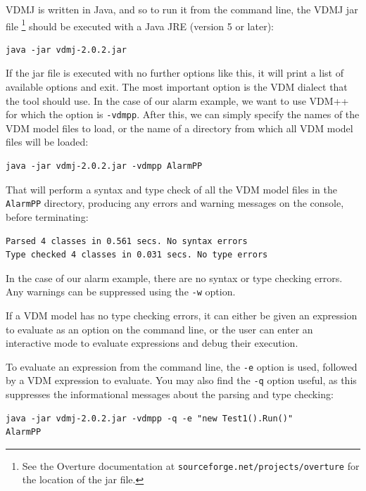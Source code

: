 VDMJ is written in Java, and so to run it from the command line, the
VDMJ jar file \footnote{See the Overture documentation at
  \texttt{sourceforge.net/projects/overture} for the location of the
  jar file.}  should be executed with a Java JRE (version 5 or later):

\lstset{style=tool,language=}
\begin{lstlisting}
java -jar vdmj-2.0.2.jar
\end{lstlisting}

\noindent If the jar file is executed with no further options like this, it will
print a list of available options and exit. The most important option is the VDM
dialect that the tool should use. In the case of our alarm example, we want to
use VDM++ for which the option is \verb|-vdmpp|. After this, we can simply
specify the names of the VDM model files to load, or the name of a
directory from which all VDM model files will be loaded:

\begin{lstlisting}
java -jar vdmj-2.0.2.jar -vdmpp AlarmPP
\end{lstlisting}

\noindent That will perform a syntax and type check of all the
VDM model files in the \verb|AlarmPP| directory, producing any
errors and warning messages on the console, before terminating:

\begin{lstlisting}
Parsed 4 classes in 0.561 secs. No syntax errors
Type checked 4 classes in 0.031 secs. No type errors
\end{lstlisting}

\noindent In the case of our alarm example, there are no syntax or
type checking errors. Any warnings can be suppressed using the
\verb|-w| option.

If a VDM model has no type checking errors, it can either be given
an expression to evaluate as an option on the command line, or the
user can enter an interactive mode to evaluate expressions and debug
their execution.

To evaluate an expression from the command line, the \verb|-e| option
is used, followed by a VDM expression to evaluate. You may also find
the \verb|-q| option useful, as this suppresses the informational
messages about the parsing and type checking:

\begin{lstlisting}
java -jar vdmj-2.0.2.jar -vdmpp -q -e "new Test1().Run()" 
AlarmPP
\end{lstlisting}

